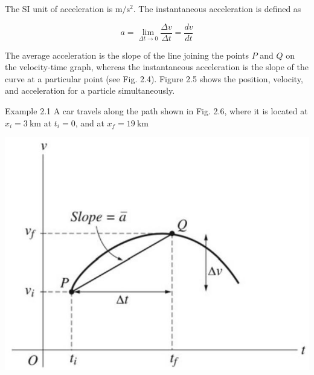 \documentclass[10pt]{article}
\begin{document}
The SI unit of acceleration is $\mathrm{m} / \mathrm{s}^{2}$. The instantaneous acceleration is defined as

$$
a=\lim _{\Delta t \rightarrow 0} \frac{\Delta v}{\Delta t}=\frac{d v}{d t}
$$

The average acceleration is the slope of the line joining the points $P$ and $Q$ on the velocity-time graph, whereas the instantaneous acceleration is the slope of the curve at a particular point (see Fig. 2.4). Figure 2.5 shows the position, velocity, and acceleration for a particle simultaneously.

Example 2.1 A car travels along the path shown in Fig. 2.6, where it is located at $x_{i}=3 \mathrm{~km}$ at $t_{i}=0$, and at $x_{f}=19 \mathrm{~km}$

\begin{center}
\includegraphics[max width=\textwidth]{2024_09_13_db1f357d2aad0a03eb2eg-029}
\end{center}
\end{document}
